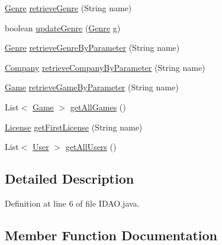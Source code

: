 \begin{DoxyCompactItemize}
\item 
\hyperlink{classes_1_1deusto_1_1server_1_1db_1_1data_1_1_genre}{Genre} \hyperlink{interfacees_1_1deusto_1_1server_1_1db_1_1dao_1_1_i_d_a_o_a8b15955637f9b81c57900761c6d03571}{retrieve\+Genre} (String name)
\item 
boolean \hyperlink{interfacees_1_1deusto_1_1server_1_1db_1_1dao_1_1_i_d_a_o_ae989ff2681d6afe8651a595340265c39}{update\+Genre} (\hyperlink{classes_1_1deusto_1_1server_1_1db_1_1data_1_1_genre}{Genre} g)
\item 
\hyperlink{classes_1_1deusto_1_1server_1_1db_1_1data_1_1_genre}{Genre} \hyperlink{interfacees_1_1deusto_1_1server_1_1db_1_1dao_1_1_i_d_a_o_aecdf5c34463102b38528152c0dfc9811}{retrieve\+Genre\+By\+Parameter} (String name)
\item 
\hyperlink{classes_1_1deusto_1_1server_1_1db_1_1data_1_1_company}{Company} \hyperlink{interfacees_1_1deusto_1_1server_1_1db_1_1dao_1_1_i_d_a_o_a5bab06408d3191e9bfd553384e65e7a4}{retrieve\+Company\+By\+Parameter} (String name)
\item 
\hyperlink{classes_1_1deusto_1_1server_1_1db_1_1data_1_1_game}{Game} \hyperlink{interfacees_1_1deusto_1_1server_1_1db_1_1dao_1_1_i_d_a_o_a5189543a4a8e9e3bed8df7d452db283a}{retrieve\+Game\+By\+Parameter} (String name)
\item 
List$<$ \hyperlink{classes_1_1deusto_1_1server_1_1db_1_1data_1_1_game}{Game} $>$ \hyperlink{interfacees_1_1deusto_1_1server_1_1db_1_1dao_1_1_i_d_a_o_aebafef372cf3064b12d16fcb651b41ff}{get\+All\+Games} ()
\item 
\hyperlink{classes_1_1deusto_1_1server_1_1db_1_1data_1_1_license}{License} \hyperlink{interfacees_1_1deusto_1_1server_1_1db_1_1dao_1_1_i_d_a_o_aef2783889a572e23bd57c5a2a955599a}{get\+First\+License} (String name)
\item 
List$<$ \hyperlink{classes_1_1deusto_1_1server_1_1db_1_1data_1_1_user}{User} $>$ \hyperlink{interfacees_1_1deusto_1_1server_1_1db_1_1dao_1_1_i_d_a_o_a3786445c689f73ccd693c57a629c02de}{get\+All\+Users} ()
\end{DoxyCompactItemize}


\subsection{Detailed Description}


Definition at line 6 of file I\+D\+A\+O.\+java.



\subsection{Member Function Documentation}
\mbox{\label{interfacees_1_1deusto_1_1server_1_1db_1_1dao_1_1_i_d_a_o_aebafef372cf3064b12d16fcb651b41ff}} 
